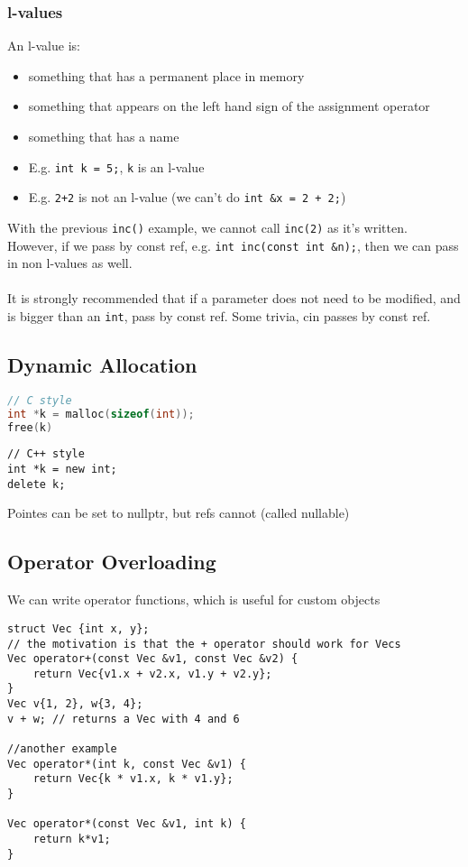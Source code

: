 \documentclass[12pt]{article}
\begin{document}
\subsubsection{l-values}

An l-value is:
\begin{itemize}
    \item something that has a permanent place in memory
    \item something that appears on the left hand sign of the assignment operator
    \item something that has a name
    \item E.g. \lstinline{int k = 5;}, \lstinline{k} is an l-value
    \item E.g. \lstinline{2+2} is not an l-value (we can't do \lstinline{int &x = 2 + 2;})
\end{itemize}
With the previous \lstinline{inc()} example, we cannot call \lstinline{inc(2)} as it's written. However, if we pass by const ref, e.g. \lstinline{int inc(const int &n);}, then we can pass in non l-values as well.\\\\
It is strongly recommended that if a parameter does not need to be modified, and is bigger than an \lstinline{int}, pass by const ref. Some trivia, cin passes by const ref.

\subsection{Dynamic Allocation}
\begin{lstlisting}[language=C]
// C style
int *k = malloc(sizeof(int));
free(k)
\end{lstlisting}
\begin{lstlisting}
// C++ style
int *k = new int;
delete k;
\end{lstlisting}
Pointes can be set to nullptr, but refs cannot (called nullable)

\subsection{Operator Overloading}
We can write operator functions, which is useful for custom objects
\begin{lstlisting}
struct Vec {int x, y};
// the motivation is that the + operator should work for Vecs
Vec operator+(const Vec &v1, const Vec &v2) {
    return Vec{v1.x + v2.x, v1.y + v2.y};
}
Vec v{1, 2}, w{3, 4};
v + w; // returns a Vec with 4 and 6

//another example
Vec operator*(int k, const Vec &v1) {
    return Vec{k * v1.x, k * v1.y};
}

Vec operator*(const Vec &v1, int k) {
    return k*v1;
}
\end{lstlisting}
\end{document}
